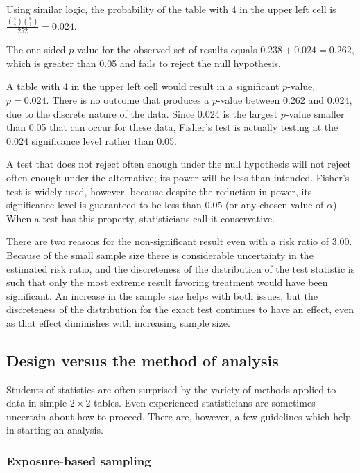 \begin{examplewrap}
\begin{nexample}
		Using similar logic, the probability of the table with 4 in the upper left cell is $\frac{{4 \choose 4} {6 \choose 1}}{252} = 0.024$.

		The one-sided $p$-value for the observed set of results equals $0.238 + 0.024 = 0.262$, which is greater than 0.05 and fails to reject the null hypothesis.

        A table with 4 in the upper left cell would result in a significant $p$-value, $p = 0.024$. There is no outcome that produces a $p$-value between 0.262 and 0.024, due to the discrete nature of the data. Since 0.024 is the largest $p$-value smaller than 0.05 that can occur for these data, Fisher's test is actually testing at the 0.024 significance level rather than 0.05.
	\end{nexample}
\end{examplewrap}

A test that does not reject often enough under the null hypothesis will not reject often enough under the alternative; its power will be less than intended. Fisher's test is widely used, however, because despite the reduction in power, its significance level is guaranteed to be less than 0.05 (or any chosen value of $\alpha$).  When a test has this property, statisticians call it conservative.

There are two reasons for the non-significant result even with a risk ratio of 3.00.  Because of the small sample size there is considerable uncertainty in the estimated risk ratio, and the discreteness of the distribution of the test statistic is such that only the most extreme result favoring treatment would have been significant.  An increase in the sample size helps with both issues, but the discreteness of the distribution for the exact test continues to have an effect, even as that effect diminishes with increasing sample size.


\subsection{Design versus the method of analysis}
\label{designVsAnalysisBinaryData}

Students of statistics are often surprised by the variety of methods applied to data in simple $2 \times 2$ tables.  Even experienced statisticians are sometimes uncertain about how to proceed.  There are, however, a few guidelines which help in starting an analysis.

\subsubsection{Exposure-based sampling}


